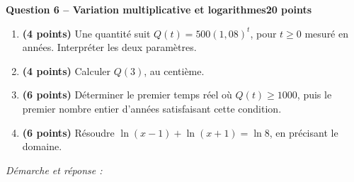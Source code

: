 \documentclass[11pt,a4paper]{article}
\begin{document}
\newpage
{\large\bfseries Question 6 -- Variation multiplicative et logarithmes}\hfill\textbf{20 points}\par
\begin{enumerate}
\item \textbf{(4 points)} Une quantité suit \(Q(t)=500(1{,}08)^t\), pour \(t\ge0\) mesuré en années. Interpréter les deux paramètres.
\item \textbf{(4 points)} Calculer \(Q(3)\), au centième.
\item \textbf{(6 points)} Déterminer le premier temps réel où \(Q(t)\ge1000\), puis le premier nombre entier d’années satisfaisant cette condition.
\item \textbf{(6 points)} Résoudre \(\ln(x-1)+\ln(x+1)=\ln8\), en précisant le domaine.
\end{enumerate}
\vspace{3mm}\textit{Démarche et réponse :}\par\vfill
\end{document}
